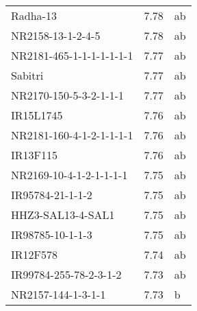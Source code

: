 \documentclass[]{article}
\begin{document}
\begin{longtable}{lll}
\rowcolor{gray!6}  Radha-13 & 7.78 & ab\\
NR2158-13-1-2-4-5 & 7.78 & ab\\
\addlinespace
\rowcolor{gray!6}  NR2181-465-1-1-1-1-1-1-1 & 7.77 & ab\\
Sabitri & 7.77 & ab\\
\rowcolor{gray!6}  NR2170-150-5-3-2-1-1-1 & 7.77 & ab\\
IR15L1745 & 7.76 & ab\\
\rowcolor{gray!6}  NR2181-160-4-1-2-1-1-1-1 & 7.76 & ab\\
\addlinespace
IR13F115 & 7.76 & ab\\
\rowcolor{gray!6}  NR2169-10-4-1-2-1-1-1-1 & 7.75 & ab\\
IR95784-21-1-1-2 & 7.75 & ab\\
\rowcolor{gray!6}  HHZ3-SAL13-4-SAL1 & 7.75 & ab\\
IR98785-10-1-1-3 & 7.75 & ab\\
\addlinespace
\rowcolor{gray!6}  IR12F578 & 7.74 & ab\\
IR99784-255-78-2-3-1-2 & 7.73 & ab\\
\rowcolor{gray!6}  NR2157-144-1-3-1-1 & 7.73 & b\\
\bottomrule
\end{longtable}
\endgroup{}
\begingroup\fontsize{12}{14}\selectfont
\end{document}
